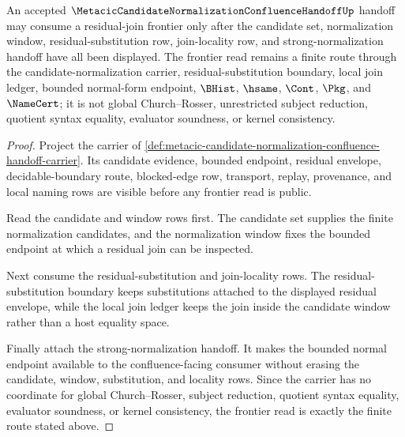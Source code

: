 \begin{theorem}
\label{thm:metacic-candidate-normalization-confluence-residual-join-frontier}
An accepted $\MetacicCandidateNormalizationConfluenceHandoffUp$ handoff may consume a residual-join frontier only after the candidate set, normalization window, residual-substitution row, join-locality row, and strong-normalization handoff have all been displayed. The frontier read remains a finite route through the candidate-normalization carrier, residual-substitution boundary, local join ledger, bounded normal-form endpoint, $\BHist$, $\hsame$, $\Cont$, $\Pkg$, and $\NameCert$; it is not global Church--Rosser, unrestricted subject reduction, quotient syntax equality, evaluator soundness, or kernel consistency.
\end{theorem}
\begin{proof}
Project the carrier of \autoref{def:metacic-candidate-normalization-confluence-handoff-carrier}. Its candidate evidence, bounded endpoint, residual envelope, decidable-boundary route, blocked-edge row, transport, replay, provenance, and local naming rows are visible before any frontier read is public.

Read the candidate and window rows first. The candidate set supplies the finite normalization candidates, and the normalization window fixes the bounded endpoint at which a residual join can be inspected.

Next consume the residual-substitution and join-locality rows. The residual-substitution boundary keeps substitutions attached to the displayed residual envelope, while the local join ledger keeps the join inside the candidate window rather than a host equality space.

Finally attach the strong-normalization handoff. It makes the bounded normal endpoint available to the confluence-facing consumer without erasing the candidate, window, substitution, and locality rows. Since the carrier has no coordinate for global Church--Rosser, subject reduction, quotient syntax equality, evaluator soundness, or kernel consistency, the frontier read is exactly the finite route stated above.
\end{proof}
